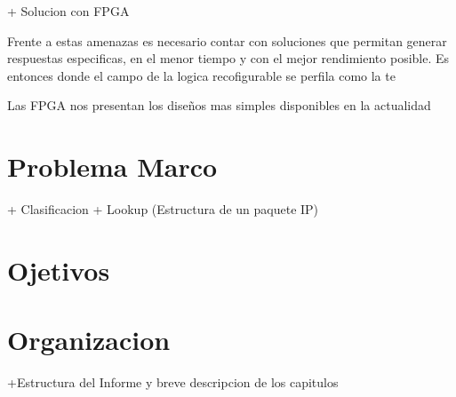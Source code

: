 + Solucion con FPGA

Frente a estas amenazas es necesario contar con soluciones que permitan generar respuestas especificas, en el menor tiempo y con el mejor rendimiento posible. Es entonces donde el campo de la logica recofigurable se perfila como la te


Las FPGA nos presentan los diseños mas simples disponibles en la actualidad 
\section{Problema Marco}

+ Clasificacion
+ Lookup (Estructura de un paquete IP)

\section{Ojetivos}
\section{Organizacion}
+Estructura del Informe y breve descripcion de los capitulos





